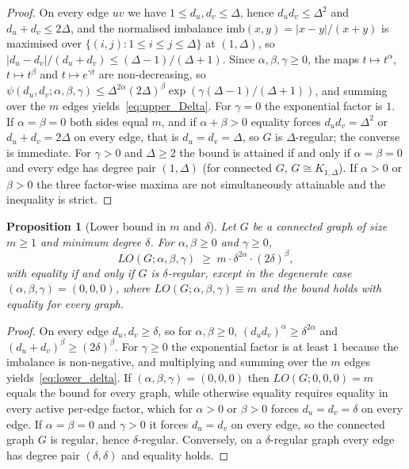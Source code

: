 \documentclass[a5paper, 10pt]{article}
\theoremstyle{plain}
\newtheorem{proposition}[theorem]{Proposition}
\theoremstyle{remark}
\theoremstyle{definition}
\newcommand{\Wuzi}{LO(G;\alpha,\beta,\gamma)}
\begin{document}
  \begin{proof}
  On every edge $uv$ we have $1 \le d_u, d_v \le \Delta$, hence
  $d_u d_v \le \Delta^2$ and $d_u + d_v \le 2\Delta$, and the normalised
  imbalance $\mathrm{imb}(x, y) = |x - y|/(x + y)$ is maximised over
  $\{(i, j) : 1 \le i \le j \le \Delta\}$ at $(1, \Delta)$, so
  $|d_u - d_v|/(d_u + d_v) \le (\Delta - 1)/(\Delta + 1)$. Since
  $\alpha, \beta, \gamma \ge 0$, the maps $t \mapsto t^{\alpha}$,
  $t \mapsto t^{\beta}$ and $t \mapsto e^{\gamma t}$ are non-decreasing,
  so $\psi(d_u, d_v; \alpha, \beta, \gamma) \le \Delta^{2\alpha}
  (2\Delta)^{\beta} \exp(\gamma(\Delta - 1)/(\Delta + 1))$, and summing over
  the $m$ edges yields~\eqref{eq:upper_Delta}. For $\gamma = 0$ the
  exponential factor is $1$. If $\alpha = \beta = 0$ both sides equal
  $m$, and if $\alpha + \beta > 0$ equality forces $d_u d_v = \Delta^2$
  or $d_u + d_v = 2\Delta$ on every edge, that is $d_u = d_v = \Delta$,
  so $G$ is $\Delta$-regular; the converse is immediate. For
  $\gamma > 0$ and $\Delta \ge 2$ the bound is attained if and only if
  $\alpha = \beta = 0$ and every edge has degree pair $(1, \Delta)$
  (for connected $G$, $G \cong K_{1,\Delta}$). If $\alpha > 0$ or
  $\beta > 0$ the three factor-wise maxima are not simultaneously
  attainable and the inequality is strict.
  \end{proof}

  \begin{proposition}[Lower bound in $m$ and $\delta$]\label{thm:lower_delta}
  Let $G$ be a connected graph of size $m \ge 1$ and minimum degree $\delta$. For
  $\alpha, \beta \ge 0$ and $\gamma \ge 0$,
  \begin{equation}\label{eq:lower_delta}
  \Wuzi \;\ge\; m \cdot \delta^{2\alpha} \cdot (2\delta)^{\beta},
  \end{equation}
  with equality if and only if $G$ is $\delta$-regular, except in the
  degenerate case $(\alpha, \beta, \gamma) = (0, 0, 0)$, where
  $\Wuzi \equiv m$ and the bound holds with equality for every graph.
  \end{proposition}

  \begin{proof}
  On every edge $d_u, d_v \ge \delta$, so for $\alpha, \beta \ge 0$,
  $(d_u d_v)^{\alpha} \ge \delta^{2\alpha}$ and
  $(d_u + d_v)^{\beta} \ge (2\delta)^{\beta}$. For $\gamma \ge 0$ the
  exponential factor is at least $1$ because the imbalance is
  non-negative, and multiplying and summing over the $m$ edges
  yields~\eqref{eq:lower_delta}. If $(\alpha, \beta, \gamma) = (0, 0, 0)$
  then $LO(G; 0, 0, 0) = m$ equals the bound for every graph, while otherwise
  equality requires equality in every active per-edge factor, which for
  $\alpha > 0$ or $\beta > 0$ forces $d_u = d_v = \delta$ on every
  edge. If $\alpha = \beta = 0$ and $\gamma > 0$ it forces $d_u = d_v$
  on every edge, so the connected graph $G$ is regular, hence
  $\delta$-regular. Conversely, on a $\delta$-regular graph every edge
  has degree pair $(\delta, \delta)$ and equality holds.
  \end{proof}
\end{document}
